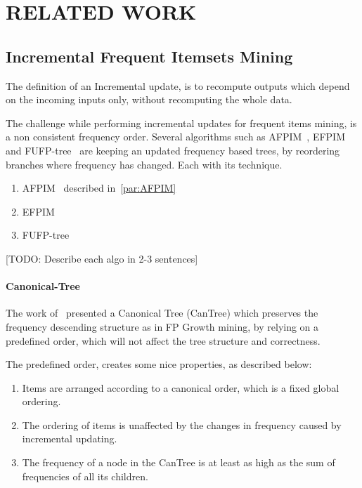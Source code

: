 \section{RELATED WORK}

\subsection{Incremental Frequent Itemsets Mining}
The definition of an Incremental update, is to recompute outputs which depend on the incoming inputs only, without recomputing the whole data.

The challenge while performing incremental updates for frequent items mining, is a non consistent frequency order. Several algorithms such as AFPIM~\cite{koh2004efficient}, EFPIM~\cite{li2006fast} and FUFP-tree~\cite{hong2008incrementally} are keeping an updated frequency based trees, by reordering branches where frequency has changed.  Each with its technique.
\begin{enumerate}
\item AFPIM~\cite{koh2004efficient}  described in~\autoref{par:AFPIM}
\item EFPIM~\cite{li2006fast}
\item FUFP-tree~\cite{hong2008incrementally}
\end{enumerate}

[TODO: Describe each algo in 2-3 sentences]

\paragraph{Canonical-Tree}
The work of~\cite{leung2005cantree} presented a Canonical Tree (CanTree) which preserves the frequency descending structure as in FP Growth mining, by relying on a predefined order, which will not affect the tree structure and correctness.

The predefined order, creates some nice properties, as described below:

\begin{enumerate}
	\item Items are arranged according to a canonical order, which is a fixed
global ordering.
	\item The ordering of items is unaffected by the changes in frequency
caused by incremental updating.
	\item The frequency of a node in the CanTree is at least as high as the sum
of frequencies of all its children.
\end{enumerate}

